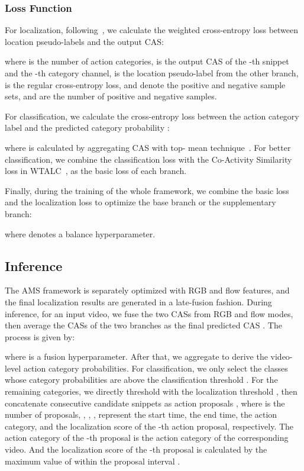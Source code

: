 \documentclass[journal]{IEEEtran}
\begin{document}
\subsubsection{\textbf{Loss Function}}
For localization, following~\cite{lin2018bsn,zhao2020bottom,lin2019bmn}, we calculate the weighted cross-entropy loss between location pseudo-labels and the output CAS:

where  is the number of action categories,  is the output CAS of the -th snippet and the -th category channel,  is the location pseudo-label from the other branch,  is the regular cross-entropy loss,  and  denote the positive and negative sample sets,  and  are the number of positive and negative samples.



For classification, we calculate the cross-entropy loss between the action category label  and the predicted category probability :

where  is calculated by aggregating CAS with top- mean technique~\cite{paul2018w,lee2019background,lee2020background}. For better classification, we combine the classification loss  with the Co-Activity Similarity loss in WTALC~\cite{paul2018w}, as the basic loss  of each branch.




Finally, during the training of the whole framework, we combine the basic loss and the localization loss to optimize the base branch or the supplementary branch:

where  denotes a balance hyperparameter.




\subsection{Inference}
The AMS framework is separately optimized with RGB and flow features, and the final localization results are generated in a late-fusion fashion. During inference, for an input video, we fuse the two CASs from RGB and flow modes, then average the CASs of the two branches as the final predicted CAS . The process is given by:

where  is a fusion hyperparameter. After that, we aggregate  to derive the video-level action category probabilities. For classification, we only select the classes whose category probabilities are above the classification threshold . For the remaining categories, we directly threshold  with the localization threshold , then concatenate consecutive candidate snippets as action proposals , where  is the number of proposals, , , ,  represent the start time, the end time, the action category, and the localization score of the -th action proposal, respectively. The action category  of the -th proposal is the action category of the corresponding video. And the localization score  of the -th proposal is calculated by the maximum value of  within the proposal interval .
\end{document}
